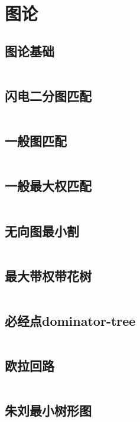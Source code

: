 \chapter{图论}
\section{图论基础}
\inputminted{cpp}{\source/graph-theory/basic.cpp}
\section{闪电二分图匹配}
\inputminted{cpp}{\source/graph-theory/Hopcroft-Karp.cpp}
\section{一般图匹配}
\inputminted{cpp}{\source/graph-theory/general-matching.cpp}
\section{一般最大权匹配}
\inputminted{cpp}{\source/graph-theory/weighted_blossom.cpp}
\section{无向图最小割}
\inputminted{cpp}{\source/graph-theory/StoerWagner_O(V^3).cpp}
\section{最大带权带花树}
\inputminted{cpp}{\source/graph-theory/weighted_blossom.cpp}
\section{必经点dominator-tree}
\inputminted{cpp}{\source/graph-theory/dominator.cpp}
\section{欧拉回路}
\inputminted{cpp}{\source/graph-theory/euler-tour.cpp}
\section{朱刘最小树形图}
\inputminted{cpp}{\source/graph-theory/minimum_arborescence.cpp}

